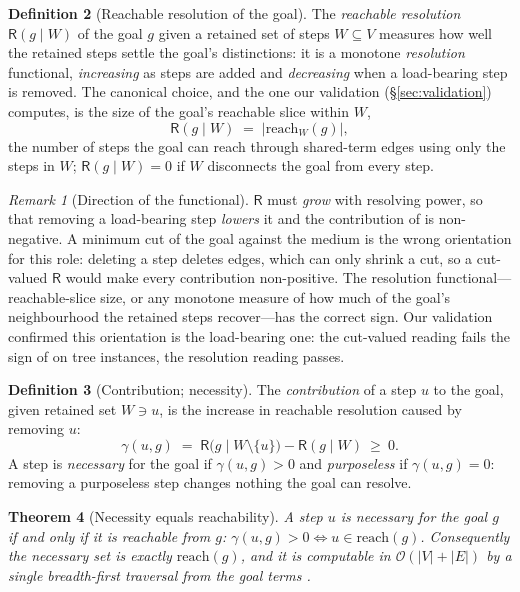 \documentclass[11pt,twocolumn,a4paper]{article}
\theoremstyle{thmstyle}
\newtheorem{theorem}{Theorem}[section]
\theoremstyle{definition}
\newtheorem{definition}[theorem]{Definition}
\theoremstyle{remark}
\newtheorem{remark}[theorem]{Remark}
\newcommand{\Vrt}{V}
\newcommand{\Edg}{E}
\newcommand{\goal}{g}                   %
\newcommand{\reach}{\mathrm{reach}}
\newcommand{\Res}{\mathsf{R}}           %
\newcommand{\contrib}{\gamma}           %
\newcommand{\abs}[1]{\lvert#1\rvert}
\newcommand{\set}[1]{\{#1\}}
\begin{document}
\begin{definition}[Reachable resolution of the goal]
\label{def:resolution}
The \emph{reachable resolution} $\Res(\goal\mid W)$ of the goal $\goal$ given a
retained set of steps $W\subseteq\Vrt$ measures how well the retained steps
settle the goal's distinctions: it is a monotone \emph{resolution} functional,
\emph{increasing} as steps are added and \emph{decreasing} when a load-bearing
step is removed. The canonical choice, and the one our validation
(\S\ref{sec:validation}) computes, is the size of the goal's reachable slice
within $W$,
\[
\Res(\goal\mid W)\;=\;\abs{\reach_W(\goal)},
\]
the number of steps the goal can reach through shared-term edges using only the
steps in $W$; $\Res(\goal\mid W)=0$ if $W$ disconnects the goal from every step.
\begin{remark}[Direction of the functional]
\label{rem:resolution-direction}
$\Res$ must \emph{grow} with resolving power, so that removing a load-bearing
step \emph{lowers} it and the contribution of  is
non-negative. A minimum cut of the goal against the medium is the wrong
orientation for this role: deleting a step deletes edges, which can only shrink
a cut, so a cut-valued $\Res$ would make every contribution non-positive. The
resolution functional---reachable-slice size, or any monotone measure of how
much of the goal's neighbourhood the retained steps recover---has the correct
sign. Our validation confirmed this orientation is the load-bearing one: the
cut-valued reading fails the sign of  on tree instances,
the resolution reading passes.
\end{remark}
\end{definition}

\begin{definition}[Contribution; necessity]
\label{def:contribution}
The \emph{contribution} of a step $u$ to the goal, given retained set $W\ni u$,
is the increase in reachable resolution caused by removing $u$:
\[
\contrib(u,\goal)\;=\;\Res\bigl(\goal\mid W\setminus\set u\bigr)-\Res(\goal\mid W)\ \ge\ 0.
\]
A step is \emph{necessary} for the goal if $\contrib(u,\goal)>0$ and
\emph{purposeless} if $\contrib(u,\goal)=0$: removing a purposeless step changes
nothing the goal can resolve.
\end{definition}

\begin{theorem}[Necessity equals reachability]
\label{thm:necessity}
A step $u$ is necessary for the goal $\goal$ if and only if it is reachable from
$\goal$: $\contrib(u,\goal)>0 \iff u\in\reach(\goal)$. Consequently the necessary
set is exactly $\reach(\goal)$, and it is computable in
$\mathcal{O}(\abs\Vrt+\abs\Edg)$ by a single breadth-first traversal from the
goal terms \citep{tarjan1972,diestel2017}.
\end{theorem}
\end{document}
